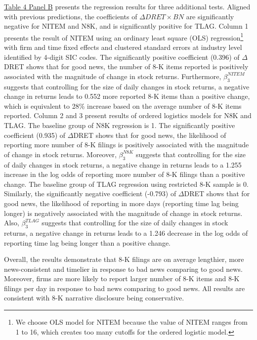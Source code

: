 \documentclass[a4paper]{article}
\begin{document}
\begin{spacing}{2}
\hyperref[T4PB]{Table 4 Panel B} presents the regression results for three additional tests. Aligned with previous predictions, the coefficients of $\Delta DRET\times BN$ are significantly negative for NITEM and N8K, and is significantly positive for TLAG. Column 1 presents the result of NITEM using an ordinary least square (OLS) regression\footnote{We choose OLS model for NITEM because the value of NITEM ranges from 1 to 16, which creates too many cutoffs for the ordered logistic model.} with firm and time fixed effects and clustered standard errors at industry level identified by 4-digit SIC codes. The significantly positive coefficient (0.396) of $\Delta$DRET shows that for good news, the number of 8-K items reported is positively associated with the magnitude of change in stock returns. Furthermore, $\beta_3^{NITEM}$ suggests that controlling for the size of daily changes in stock returns, a negative change in returns leads to 0.552 more reported 8-K items than a positive change, which is equivalent to 28\% increase based on the average number of 8-K items reported. Column 2 and 3 present results of ordered logistics models for N8K and TLAG. The baseline group of N8K regression is 1. The significantly positive coefficient (0.935) of $\Delta$DRET shows that for good news, the likelihood of reporting more number of 8-K filings is positively associated with the magnitude of change in stock returns. Moreover, $\beta_3^{N8K}$ suggests that controlling for the size of daily changes in stock returns, a negative change in returns leads to a 1.255 increase in the log odds of reporting more number of 8-K filings than a positive change. The baseline group of TLAG regression using restricted 8-K sample is 0. Similarly, the significantly negative coefficient (-0.793) of $\Delta$DRET shows that for good news, the likelihood of reporting in more days (reporting time lag being longer) is negatively associated with the magnitude of change in stock returns. Also, $\beta_3^{TLAG}$ suggests that controlling for the size of daily changes in stock returns, a negative change in returns leads to a 1.246 decrease in the log odds of reporting time lag being longer than a positive change. 

Overall, the results demonstrate that 8-K filings are on average lengthier, more news-consistent and timelier in response to bad news comparing to good news. Moreover, firms are more likely to report larger number of 8-K items and 8-K filings per day in response to bad news comparing to good news. All results are consistent with 8-K narrative disclosure being conservative.

\end{spacing}
\end{document}
